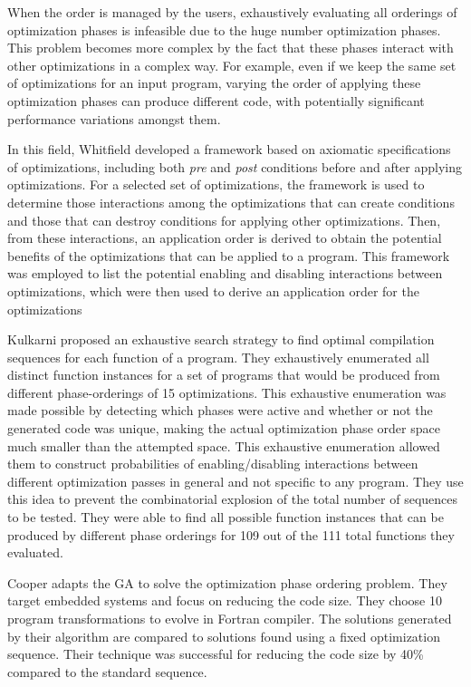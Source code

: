When the order is managed by the users, exhaustively evaluating  all orderings of optimization phases is infeasible due to the huge number optimization phases. This problem becomes more complex by the fact that these phases interact with other optimizations in a complex way.
For example, even if we keep the same set of optimizations for an input program, varying the order of applying these optimization phases can produce different code, with potentially significant performance variations amongst them. 

In this field, Whitfield\cite{whitfield1990approach} developed a framework based on axiomatic specifications of optimizations, including both \textit{pre} and \textit{post} conditions before and after applying optimizations. For a selected set of optimizations, the framework is used to determine those interactions among the optimizations that can create conditions and those that can destroy conditions for applying other optimizations. Then, from these interactions, an application order is derived to obtain the potential benefits of the optimizations that can be applied to a program. 
This framework was employed to list the potential enabling and disabling interactions between optimizations, which were then used to derive an application
order for the optimizations

Kulkarni \etal\cite{kulkarni2009practical,kulkarni2006exhaustive} proposed an exhaustive search strategy to find optimal compilation sequences for each function of a program. They exhaustively enumerated all distinct function instances for a set of programs that would be produced from different phase-orderings of 15 optimizations. This exhaustive enumeration was made possible by detecting which phases were active and whether or not the generated code was unique, making the actual optimization phase order space much smaller than the attempted space. This exhaustive enumeration allowed them to construct probabilities of enabling/disabling interactions between different optimization passes in general and not specific to any program. They use this idea to prevent the combinatorial explosion of the total number of sequences to be tested. 
They were able to find all possible function instances that can be produced by different phase orderings for 109 out of the 111 total functions they evaluated.


Cooper \etal\cite{cooper1999optimizing} adapts the GA to solve the optimization phase ordering problem. They target embedded systems and focus on reducing the code size. They choose 10 program transformations to evolve in Fortran compiler. The solutions generated by their algorithm are compared to solutions found using a fixed optimization sequence. Their technique was successful for reducing the code size by 40\% compared to the standard sequence.

